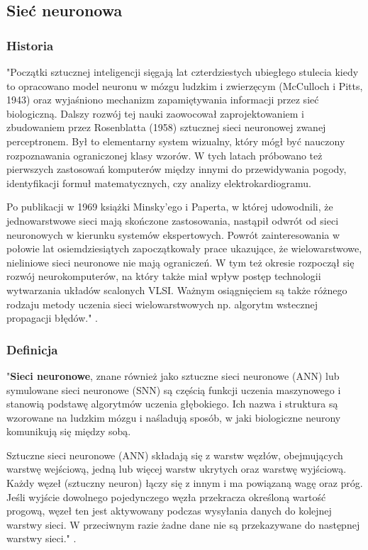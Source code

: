 \pagebreak

\subsection{Sieć neuronowa}

\subsubsection{Historia}
\begin{description}
 \item "Początki sztucznej inteligencji sięgają lat czterdziestych ubiegłego stulecia kiedy to opracowano model neuronu w mózgu ludzkim i zwierzęcym (McCulloch i Pitts, 1943) oraz wyjaśniono mechanizm zapamiętywania informacji przez sieć biologiczną. Dalszy rozwój tej nauki zaowocował zaprojektowaniem i zbudowaniem przez Rosenblatta (1958) sztucznej sieci neuronowej zwanej perceptronem. Był to elementarny system wizualny, który mógł być nauczony rozpoznawania ograniczonej klasy wzorów. W tych latach próbowano też pierwszych zastosowań komputerów między innymi do przewidywania pogody, identyfikacji formuł matematycznych, czy analizy elektrokardiogramu.
 
 \item Po publikacji w 1969 książki Minsky'ego i Paperta, w której udowodnili, że jednowarstwowe sieci mają skończone zastosowania, nastąpił odwrót od sieci neuronowych w kierunku systemów ekspertowych. Powrót zainteresowania w połowie lat osiemdziesiątych zapoczątkowały prace ukazujące, że wielowarstwowe, nieliniowe sieci neuronowe nie mają ograniczeń. W tym też okresie rozpoczął się rozwój neurokomputerów, na który także miał wpływ postęp technologii wytwarzania układów scalonych VLSI. Ważnym osiągnięciem są także różnego rodzaju metody uczenia sieci wielowarstwowych np. algorytm wstecznej propagacji błędów." \cite{wstepAGH}.
\end{description}

\subsubsection{Definicja}
\begin{description}
\item "\textbf{Sieci neuronowe}, znane również jako sztuczne sieci neuronowe (ANN) lub symulowane sieci neuronowe (SNN) są częścią funkcji uczenia maszynowego i stanowią podstawę algorytmów uczenia głębokiego. Ich nazwa i struktura są wzorowane na ludzkim mózgu i naśladują sposób, w jaki biologiczne neurony komunikują się między sobą.

Sztuczne sieci neuronowe (ANN) składają się z warstw węzłów, obejmujących warstwę wejściową, jedną lub więcej warstw ukrytych oraz warstwę wyjściową. Każdy węzeł (sztuczny neuron) łączy się z innym i ma powiązaną wagę oraz próg. Jeśli wyjście dowolnego pojedynczego węzła przekracza określoną wartość progową, węzeł ten jest aktywowany podczas wysyłania danych do kolejnej warstwy sieci. W przeciwnym razie żadne dane nie są przekazywane do następnej warstwy sieci." \cite{ibm}.
\end{description}

